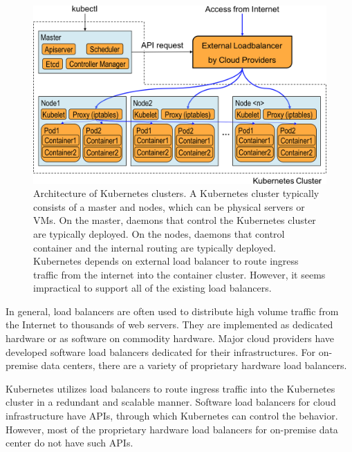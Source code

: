 \begin{figure}[h]
  \centering
  \includegraphics[width=0.8\columnwidth]{Figs/K8sConventional}
  
  \centering
  
  \begin{minipage}{0.9\columnwidth}
    \caption[Architecture of Kubernetes clusters]{
      Architecture of Kubernetes clusters.
      A Kubernetes cluster typically consists of a master and nodes, which can be physical servers or VMs.
      On the master, daemons that control the Kubernetes cluster are typically deployed. 
      On the nodes,  daemons that control container and the internal routing are typically deployed.
      Kubernetes depends on external load balancer to route ingress traffic from the internet into the container cluster.
      However, it seems impractical to support all of the existing load balancers.
    }
    \label{fig:k8s_intro}
  \end{minipage}
  
\end{figure}

In general, load balancers are often used to distribute high volume traffic from the Internet to thousands of web servers.
They are implemented as dedicated hardware or as software on commodity hardware.
Major cloud providers have developed software load balancers \cite{eisenbud2016maglev,patel2013ananta} dedicated for their infrastructures.
For on-premise data centers, there are a variety of proprietary hardware load balancers.

Kubernetes utilizes load balancers to route ingress traffic into the Kubernetes cluster in a redundant and scalable manner. 
Software load balancers for cloud infrastructure have APIs, through which Kubernetes can control the behavior.
However, most of the proprietary hardware load balancers for on-premise data center do not have such APIs.

